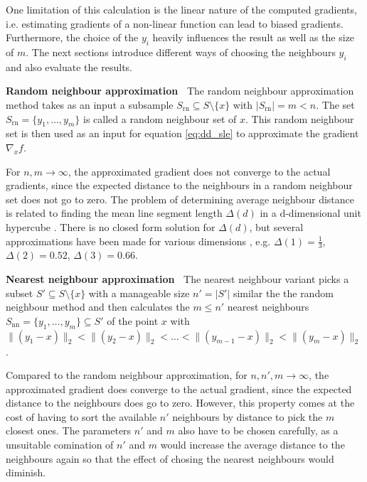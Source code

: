 \documentclass[
  a4paper,  %
  twoside,  %
  bibliography=totoc,
  headsepline,
  cleardoublepage=empty,
  parskip=half,
  draft=false
]{scrbook}
\begin{document}
One limitation of this calculation is the linear nature of the computed gradients, i.e. estimating gradients of a non-linear function can lead to biased gradients.
Furthermore, the choice of the $y_i$ heavily influences the result as well as the size of $m$.
The next sections introduce different ways of choosing the neighbours $y_i$ and also evaluate the results.

\vspace{2mm}
\textbf{Random neighbour approximation~} The random neighbour approximation method takes as an input a subsample $S_{\text{rn}} \subseteq S \setminus \{x\}$ with $|S_{\text{rn}}|=m < n$.
The set $S_{\text{rn}}=\{y_1, \dots, y_{m}\}$ is called a random neighbour set of $x$.
This random neighbour set is then used as an input for equation \cref{eq:dd_sle} to approximate the gradient $\nabla_x f$.

For $n,m \to \infty$, the approximated gradient does not converge to the actual gradients, since the expected distance to the neighbours in a random neighbour set does not go to zero.
The problem of determining average neighbour distance is related to finding the mean line segment length $\Delta (d)$ in a d-dimensional unit hypercube \cite{}.
There is no closed form solution for $\Delta (d)$, but several approximations have been made for various dimensions \cite{}, e.g. $\Delta (1)=\frac{1}{3}$, $\Delta (2)=0.52$, $\Delta (3)=0.66$.

\vspace{2mm}
\textbf{Nearest neighbour approximation~}
The nearest neighbour variant picks a subset $S' \subseteq S \setminus \{x\}$ with a manageable size $n'=|S'|$ similar the the random neighbour method and then calculates the $m \leq n'$ nearest neighbours $S_{\text{nn}}=\{y_1,\dots,y_m\} \subseteq S'$ of the point $x$ with $\|(y_1-x)\|_2 < \|(y_2-x)\|_2< \dots<\|(y_{m-1}-x)\|_2 < \|(y_{m}-x)\|_2$.

Compared to the random neighbour approximation, for $n,n',m \to \infty$, the approximated gradient does converge to the actual gradient, since the expected distance to the neighbours does go to zero.
However, this property comes at the cost of having to sort the available $n'$ neighbours by distance to pick the $m$ closest ones.
The parameters $n'$ and $m$ also have to be chosen carefully, as a unsuitable comination of $n'$ and $m$ would increase the average distance to the neighbours again so that the effect of chosing the nearest neighbours would diminish.
\end{document}
